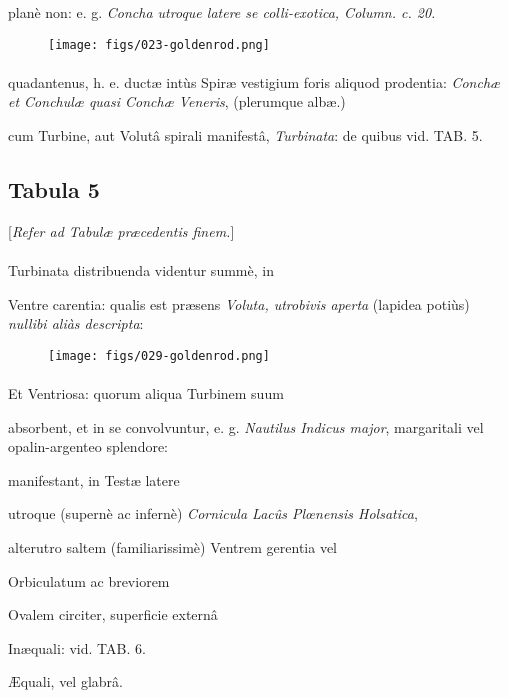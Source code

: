 \documentclass[a4paper, 11pt, oneside, polutonikogreek, german]{article}
\begin{document}
planè non: e. g. \emph{Concha utroque latere se colli-exotica, Column. c. 20.}
\begin{figure}[H]
\centering
\texttt{[image: figs/023-goldenrod.png]}
\end{figure}
\paragraph{}
quadantenus, h. e. ductæ intùs Spiræ vestigium foris aliquod prodentia: \emph{Conchæ et Conchulæ quasi Conchæ Veneris}, (plerumque albæ.)

cum Turbine, aut Volutâ spirali manifestâ, \emph{Turbinata}: de quibus vid. TAB. 5.
\clearpage
\subsection{Tabula 5}
\begin{center}
[\emph{Refer ad Tabulæ præcedentis finem.}]
\end{center}
\paragraph{}
Turbinata distribuenda videntur summè, in

Ventre carentia: qualis est præsens \emph{Voluta, utrobivis aperta} (lapidea potiùs) \emph{nullibi aliàs descripta}:

\begin{figure}[H]
\centering
\texttt{[image: figs/029-goldenrod.png]}
\end{figure}
\paragraph{}
Et Ventriosa: quorum aliqua Turbinem suum

absorbent, et in se convolvuntur, e. g. \emph{Nautilus Indicus major}, margaritali vel opalin-argenteo splendore:

manifestant, in Testæ latere

utroque (supernè ac infernè) \emph{Cornicula Lacûs Plœnensis Holsatica},

alterutro saltem (familiarissimè) Ventrem gerentia vel

Orbiculatum ac breviorem

Ovalem circiter, superficie externâ

Inæquali: vid. TAB. 6.

Æquali, vel glabrâ.
\end{document}
